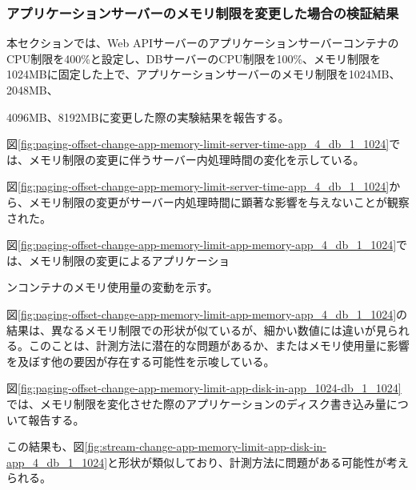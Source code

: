 \documentclass[../../../../main]{subfiles}
\begin{document}
    \subsubsection{アプリケーションサーバーのメモリ制限を変更した場合の検証結果}\label{subsubsec:result-paging-offset-change-app-memory}

    本セクションでは、Web APIサーバーのアプリケーションサーバーコンテナのCPU制限を400\%と設定し、DBサーバーのCPU制限を100\%、メモリ制限を1024MBに固定した上で、アプリケーションサーバーのメモリ制限を1024MB、2048MB、

    4096MB、8192MBに変更した際の実験結果を報告する。


    図\ref{fig:paging-offset-change-app-memory-limit-server-time-app_4_db_1_1024}では、メモリ制限の変更に伴うサーバー内処理時間の変化を示している。

    

    図\ref{fig:paging-offset-change-app-memory-limit-server-time-app_4_db_1_1024}から、メモリ制限の変更がサーバー内処理時間に顕著な影響を与えないことが観察された。


    図\ref{fig:paging-offset-change-app-memory-limit-app-memory-app_4_db_1_1024}では、メモリ制限の変更によるアプリケーショ

    ンコンテナのメモリ使用量の変動を示す。

    

    図\ref{fig:paging-offset-change-app-memory-limit-app-memory-app_4_db_1_1024}の結果は、異なるメモリ制限での形状が似ているが、細かい数値には違いが見られる。このことは、計測方法に潜在的な問題があるか、またはメモリ使用量に影響を及ぼす他の要因が存在する可能性を示唆している。


    図\ref{fig:paging-offset-change-app-memory-limit-app-disk-in-app_1024-db_1_1024}では、メモリ制限を変化させた際のアプリケーションのディスク書き込み量について報告する。

    

    この結果も、図\ref{fig:stream-change-app-memory-limit-app-disk-in-app_4_db_1_1024}と形状が類似しており、計測方法に問題がある可能性が考えられる。
\end{document}
